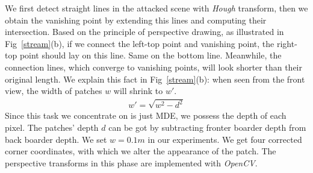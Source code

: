\documentclass[10pt,twocolumn,letterpaper]{article}
\begin{document}
We first detect straight lines in the attacked 
scene with \textit{Hough} transform, then we obtain 
the vanishing point by extending this lines 
and computing their intersection.
Based on the principle of perspective drawing, as illustrated
in Fig~\ref{stream}(b), if we connect the left-top point and 
vanishing point, the right-top point should lay on this 
line. Same on the bottom line.
Meanwhile, the connection lines, which converge to vanishing
points, will look shorter than their original length. 
We explain this fact in Fig~\ref{stream}(b):
when seen from the front
view, the width of patches $w$ will shrink to $w'$.
\begin{align}
	w' = \sqrt{w^2-d^2}
\end{align}
Since this task we concentrate on is just MDE, we possess
the depth of each pixel. 
The patches' depth $d$ can be
got by subtracting fronter boarder depth from 
back boarder depth. We set $w=0.1m$ in our experiments.
We get four corrected corner coordinates, with which we 
alter the appearance of the patch. The perspective
transforms in this phase are implemented with 
\textit{OpenCV}. 
\end{document}
